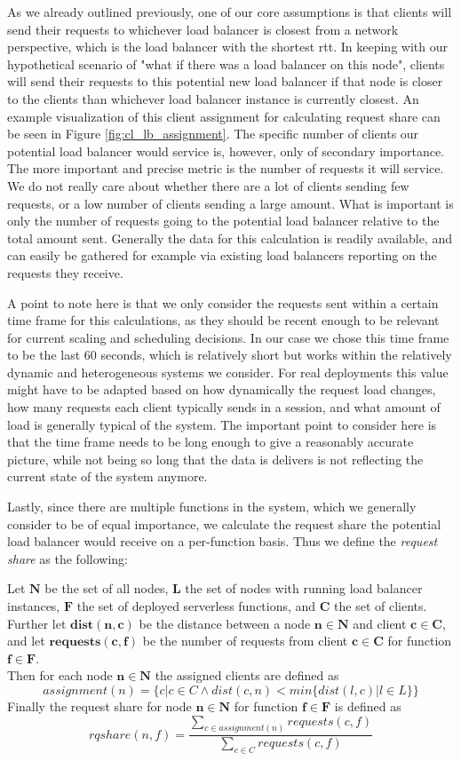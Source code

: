 \documentclass[draft,final]{vutinfth} %
\begin{document}
As we already outlined previously, one of our core assumptions is that clients will send their requests to whichever load balancer is closest from a network perspective, which is the load balancer with the shortest \gls{rtt}.
In keeping with our hypothetical scenario of "what if there was a load balancer on this node", clients will send their requests to this potential new load balancer if that node is closer to the clients than whichever load balancer instance is currently closest.
An example visualization of this client assignment for calculating request share can be seen in Figure \ref{fig:cl_lb_assignment}.
The specific number of clients our potential load balancer would service is, however, only of secondary importance. The more important and precise metric is the number of requests it will service.
We do not really care about whether there are a lot of clients sending few requests, or a low number of clients sending a large amount. What is important is only the number of requests going to the potential load balancer relative to the total amount sent.
Generally the data for this calculation is readily available, and can easily be gathered for example via existing load balancers reporting on the requests they receive.

A point to note here is that we only consider the requests sent within a certain time frame for this calculations, as they should be recent enough to be relevant for current scaling and scheduling decisions.
In our case we chose this time frame to be the last 60 seconds, which is relatively short but works within the relatively dynamic and heterogeneous systems we consider.
For real deployments this value might have to be adapted based on how dynamically the request load changes, how many requests each client typically sends in a session, and what amount of load is generally typical of the system.
The important point to consider here is that the time frame needs to be long enough to give a reasonably accurate picture, while not being so long that the data is delivers is not reflecting the current state of the system anymore.

Lastly, since there are multiple functions in the system, which we generally consider to be of equal importance, we calculate the request share the potential load balancer would receive on a per-function basis.
Thus we define the \textit{request share} as the following:

Let $\mathbf{N}$ be the set of all nodes, $\mathbf{L}$ the set of nodes with running load balancer instances, $\mathbf{F}$ the set of deployed serverless functions, and $\mathbf{C}$ the set of clients.\\
Further let $\mathbf{dist(n,c)}$ be the distance between a node $\mathbf{n \in N}$ and client $\mathbf{c \in C}$, and let $\mathbf{requests(c, f)}$ be the number of requests from client $\mathbf{c \in C}$ for function $\mathbf{f \in F}$.\\
Then for each node $\mathbf{n \in N}$ the assigned clients are defined as
\[ assignment(n) = \{c | c \in C \land dist(c,n) < min\{dist(l, c) | l \in L\}\}\]
Finally the request share for node $\mathbf{n \in N}$ for function $\mathbf{f \in F}$ is defined as
\[ rqshare(n,f) = \frac{\sum_{c \in assignment(n)}requests(c,f)}{\sum_{c \in C}requests(c,f)}\]
\end{document}
